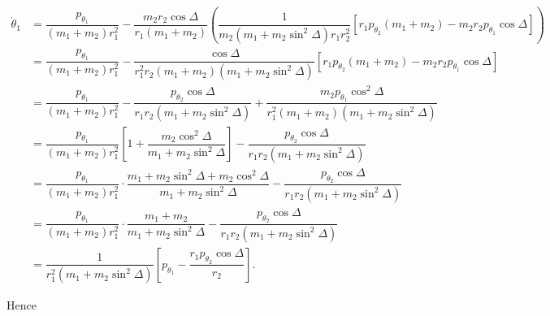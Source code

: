 \documentclass[12pt,a4paper,portrait]{article}
\begin{document}
	\begin{align*}
		\dot{\theta}_1 &= \dfrac{p_{\theta_1}}{(m_1+m_2)r_1^2} - \dfrac{m_2r_2\cos{\Delta}}{r_1(m_1+m_2)} \left(\dfrac{1}{m_2(m_1+m_2\sin^2{\Delta})r_1r_2^2} \left[r_1 p_{\theta_2}(m_1+m_2) - m_2r_2p_{\theta_1}\cos{\Delta}\right]\right) \\
		&= \dfrac{p_{\theta_1}}{(m_1+m_2)r_1^2} - \dfrac{\cos{\Delta}}{r_1^2r_2(m_1+m_2)(m_1+m_2\sin^2{\Delta})}\left[r_1 p_{\theta_2}(m_1+m_2) - m_2r_2p_{\theta_1}\cos{\Delta}\right]\\
		&= \dfrac{p_{\theta_1}}{(m_1+m_2)r_1^2} - \dfrac{p_{\theta_2}\cos{\Delta}}{r_1r_2(m_1+m_2\sin^2{\Delta})} + \dfrac{m_2p_{\theta_1}\cos^2{\Delta}}{r_1^2(m_1+m_2)(m_1+m_2\sin^2{\Delta})} \\
		&= \dfrac{p_{\theta_1}}{(m_1+m_2)r_1^2}\left[1 + \dfrac{m_2\cos^2{\Delta}}{m_1+m_2\sin^2{\Delta}}\right] - \dfrac{p_{\theta_2}\cos{\Delta}}{r_1r_2(m_1+m_2\sin^2{\Delta})} \\
		&= \dfrac{p_{\theta_1}}{(m_1+m_2)r_1^2} \cdot \dfrac{m_1+m_2\sin^2{\Delta} + m_2\cos^2{\Delta}}{m_1+m_2\sin^2{\Delta}} - \dfrac{p_{\theta_2}\cos{\Delta}}{r_1r_2(m_1+m_2\sin^2{\Delta})}\\
		&= \dfrac{p_{\theta_1}}{(m_1+m_2)r_1^2} \cdot \dfrac{m_1+m_2}{m_1+m_2\sin^2{\Delta}} - \dfrac{p_{\theta_2}\cos{\Delta}}{r_1r_2(m_1+m_2\sin^2{\Delta})}\\
		&= \dfrac{1}{r_1^2(m_1+m_2\sin^2{\Delta})}\left[p_{\theta_1}-\dfrac{r_1p_{\theta_2}\cos{\Delta}}{r_2}\right].
	\end{align*}
	
	Hence
	
\end{document}
